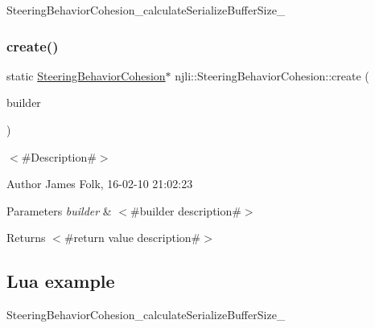 \begin{DoxyCodeInclude}
\end{DoxyCodeInclude}
Steering\+Behavior\+Cohesion\+\_\+calculate\+Serialize\+Buffer\+Size\+\_\+ \mbox{\label{classnjli_1_1_steering_behavior_cohesion_ad4617cdfd7a1faea75b249091a8fd610}} 
\subsubsection{\texorpdfstring{create()}{create()}\hspace{0.1cm}{\footnotesize\ttfamily [2/2]}}
{\footnotesize\ttfamily static \mbox{\hyperlink{classnjli_1_1_steering_behavior_cohesion}{Steering\+Behavior\+Cohesion}}$\ast$ njli\+::\+Steering\+Behavior\+Cohesion\+::create (\begin{DoxyParamCaption}\item[{const \mbox{\hyperlink{classnjli_1_1_steering_behavior_cohesion_builder}{Steering\+Behavior\+Cohesion\+Builder}} \&}]{builder }\end{DoxyParamCaption})\hspace{0.3cm}{\ttfamily [static]}}



$<$\#\+Description\#$>$ 

\begin{DoxyAuthor}{Author}
James Folk, 16-\/02-\/10 21\+:02\+:23
\end{DoxyAuthor}

\begin{DoxyParams}{Parameters}
{\em builder} & $<$\#builder description\#$>$\\
\hline
\end{DoxyParams}
\begin{DoxyReturn}{Returns}
$<$\#return value description\#$>$
\end{DoxyReturn}
\hypertarget{classnjli_1_1_steering_behavior_wander_ex1}{}\subsection{Lua example}\label{classnjli_1_1_steering_behavior_wander_ex1}

\begin{DoxyCodeInclude}
\end{DoxyCodeInclude}
Steering\+Behavior\+Cohesion\+\_\+calculate\+Serialize\+Buffer\+Size\+\_\+ \mbox{\label{classnjli_1_1_steering_behavior_cohesion_a8d370c8c902af821e61df18a59f4757d}} 
